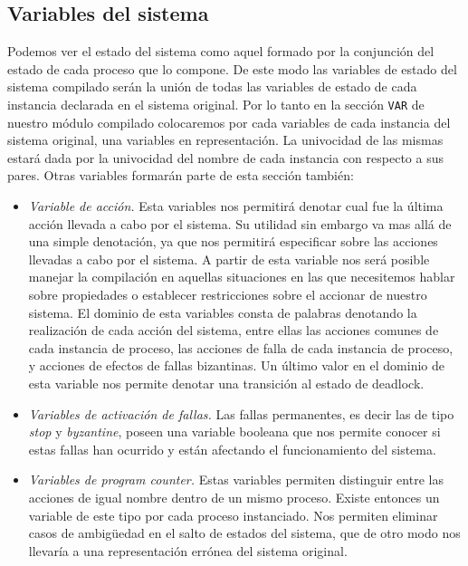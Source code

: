 \documentclass[titlepage, 12pt]{book}
\begin{document}
\subsection*{Variables del sistema}
Podemos ver el estado del sistema como aquel formado por la conjunci\'on del estado de cada proceso que lo compone. De este modo las variables de estado del sistema compilado ser\'an la uni\'on de todas las variables de estado de cada instancia declarada en el sistema original. Por lo tanto en la secci\'on \texttt{VAR} de nuestro m\'odulo compilado colocaremos por cada variables de cada instancia del sistema original, una variables en representaci\'on. La univocidad de las mismas estar\'a dada por la univocidad del nombre de cada instancia con respecto a sus pares. Otras variables formar\'an parte de esta secci\'on tambi\'en:
\begin{itemize}
\item \textit{Variable de acci\'on.} Esta variables nos permitir\'a denotar cual fue la \'ultima acci\'on llevada a cabo por el sistema. Su utilidad sin embargo va mas all\'a de una simple denotaci\'on, ya que nos permitir\'a especificar sobre las acciones llevadas a cabo por el sistema. A partir de esta variable nos ser\'a posible manejar la compilaci\'on en aquellas situaciones en las que necesitemos hablar sobre propiedades o establecer restricciones sobre el accionar de nuestro sistema. El dominio de esta variables consta de palabras denotando la realizaci\'on de cada acci\'on del sistema, entre ellas las acciones comunes de cada instancia de proceso, las acciones de falla de cada instancia de proceso, y acciones de efectos de fallas bizantinas. Un \'ultimo valor en el dominio de esta variable nos permite denotar una transici\'on al estado de deadlock.
\item \textit{Variables de activaci\'on de fallas.} Las fallas permanentes, es decir las de tipo \textit{stop} y \textit{byzantine}, poseen una variable booleana que nos permite conocer si estas fallas han ocurrido y est\'an afectando el funcionamiento del sistema.
\item \textit{Variables de program counter.} Estas variables permiten distinguir entre las acciones de igual nombre dentro de un mismo proceso. Existe entonces un variable de este tipo por cada proceso instanciado. Nos permiten eliminar casos de ambigüedad en el salto de estados del sistema, que de otro modo nos llevar\'ia a una representaci\'on err\'onea del sistema original.
\end{itemize}
\end{document}
